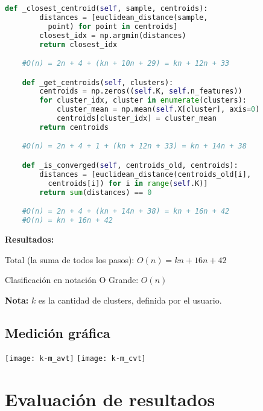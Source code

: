 \documentclass{article}
\begin{document}
\begin{lstlisting}[language=Python]
    def _closest_centroid(self, sample, centroids):
        distances = [euclidean_distance(sample,
          point) for point in centroids]
        closest_idx = np.argmin(distances)
        return closest_idx

    #O(n) = 2n + 4 + (kn + 10n + 29) = kn + 12n + 33

    def _get_centroids(self, clusters):
        centroids = np.zeros((self.K, self.n_features))
        for cluster_idx, cluster in enumerate(clusters):
            cluster_mean = np.mean(self.X[cluster], axis=0)
            centroids[cluster_idx] = cluster_mean
        return centroids

    #O(n) = 2n + 4 + 1 + (kn + 12n + 33) = kn + 14n + 38

    def _is_converged(self, centroids_old, centroids):
        distances = [euclidean_distance(centroids_old[i],
          centroids[i]) for i in range(self.K)]
        return sum(distances) == 0

    #O(n) = 2n + 4 + (kn + 14n + 38) = kn + 16n + 42
    #O(n) = kn + 16n + 42

\end{lstlisting}

\textbf{Resultados:}

Total (la suma de todos los pasos): \(O(n) = kn + 16n + 42\)

Clasificación en notación O Grande: \(O(n)\)

\textbf{Nota: }\(k\) es la cantidad de clusters, definida por el usuario.

\subsection{Medición gráfica}

\begin{center}
  \texttt{[image: k-m\_avt]}
  \texttt{[image: k-m\_cvt]}
\end{center}

\section{Evaluación de resultados}
\end{document}

